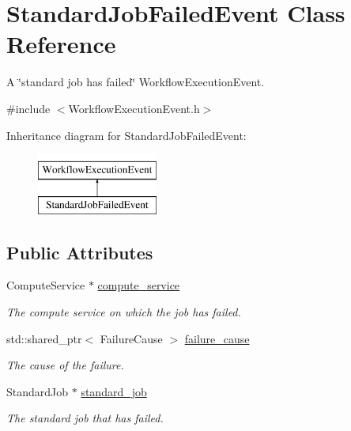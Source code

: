 \hypertarget{class_standard_job_failed_event}{}\section{Standard\+Job\+Failed\+Event Class Reference}
\label{class_standard_job_failed_event}


A \char`\"{}standard job has failed\char`\"{} Workflow\+Execution\+Event.  




{\ttfamily \#include $<$Workflow\+Execution\+Event.\+h$>$}

Inheritance diagram for Standard\+Job\+Failed\+Event\+:\begin{figure}[H]
\begin{center}
\leavevmode
\includegraphics[height=2.000000cm]{class_standard_job_failed_event}
\end{center}
\end{figure}
\subsection*{Public Attributes}
\begin{DoxyCompactItemize}
\item 
\mbox{\label{class_standard_job_failed_event_ab1e76624d5722e90b7912e08e890a2d9}} 
Compute\+Service $\ast$ \hyperlink{class_standard_job_failed_event_ab1e76624d5722e90b7912e08e890a2d9}{compute\+\_\+service}
\begin{DoxyCompactList}\small\item\em The compute service on which the job has failed. \end{DoxyCompactList}\item 
\mbox{\label{class_standard_job_failed_event_ac905d4317afdafe6bc534890313efedf}} 
std\+::shared\+\_\+ptr$<$ Failure\+Cause $>$ \hyperlink{class_standard_job_failed_event_ac905d4317afdafe6bc534890313efedf}{failure\+\_\+cause}
\begin{DoxyCompactList}\small\item\em The cause of the failure. \end{DoxyCompactList}\item 
\mbox{\label{class_standard_job_failed_event_a820b8027123f231237b6c22d25d64c2b}} 
Standard\+Job $\ast$ \hyperlink{class_standard_job_failed_event_a820b8027123f231237b6c22d25d64c2b}{standard\+\_\+job}
\begin{DoxyCompactList}\small\item\em The standard job that has failed. \end{DoxyCompactList}\end{DoxyCompactItemize}


